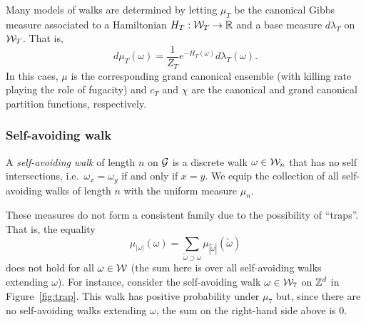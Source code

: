 Many models of walks are determined by letting $\mu_T$ be the canonical Gibbs measure
associated to a Hamiltonian $H_T : \mathcal{W}_T \rightarrow {\mathbb R}$ and a base measure $d\lambda_T$ on $\mathcal{W}_T$.
That is,
\begin{equation}
d\mu_T(\omega) = \frac{1}{Z_T} e^{-H_T(\omega)} d\lambda_T(\omega).
\end{equation}
In this caes, $\mu$ is the corresponding grand canonical ensemble (with killing rate playing
the role of fugacity) and $c_T$ and $\chi$
are the canonical and grand canonical partition functions, respectively.



\subsubsection{Self-avoiding walk}

A \emph{self-avoiding walk} of length $n$ on $\mathcal{G}$ is a discrete walk $\omega\in\mathcal{W}_n$
that has no self intersections, i.e.\ $\omega_x = \omega_y$ if and only if $x = y$.
We equip the collection of all self-avoiding walks of length $n$ with the uniform measure $\mu_n$.

These measures do not form a consistent family due to the possibility of ``traps''.
That is, the equality
\begin{equation}
\mu_{|\omega|}(\omega) = \sum_{\tilde\omega \supset \omega} \mu_{|\tilde\omega|}(\tilde\omega)
\end{equation}
does not hold for all $\omega\in\mathcal{W}$ (the sum here is over all self-avoiding walks extending
$\omega$).
For instance, consider the self-avoiding walk $\omega\in\mathcal{W}_7$ on ${ {{\mathbb Z}}^d }$ in
Figure~\ref{fig:trap}.
This walk has positive probability under $\mu_7$ but,
since there are no self-avoiding walks extending $\omega$, the sum on the right-hand side
above is $0$.

